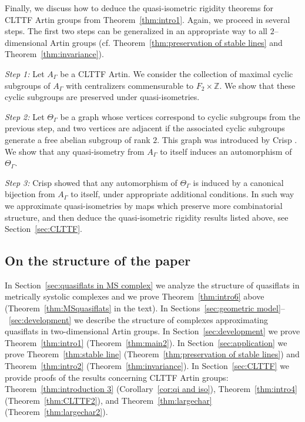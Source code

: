 \documentclass[11pt]{amsart}
\theoremstyle{definition}
\begin{document}
Finally, we discuss how to deduce the quasi-isometric rigidity theorems for CLTTF Artin groups from Theorem~\ref{thm:intro1}. Again, we proceed in several steps. The first two steps can be generalized in an appropriate way to all $2$--dimensional Artin groups (cf. Theorem~\ref{thm:preservation of stable lines} and Theorem~\ref{thm:invariance}).
\medskip

\noindent
\emph{Step 1:} Let $A_\Gamma$ be a CLTTF Artin. We consider the collection of maximal cyclic subgroups of $A_\Gamma$ with centralizers commensurable to $F_2\times\mathbb Z$. We show that these cyclic subgroups are preserved under quasi-isometries. 
\medskip

\noindent
\emph{Step 2:} Let $\Theta_\Gamma$ be a graph whose vertices correspond to cyclic subgroups from the previous step, and two vertices are adjacent if the associated cyclic subgroups generate a free abelian subgroup of rank $2$. This graph was introduced by Crisp \cite{MR2174269}. We show that any quasi-isometry from $A_\Gamma$ to itself induces an automorphism of $\Theta_\Gamma$.
\medskip

\noindent
\emph{Step 3:} Crisp \cite{MR2174269} showed that any automorphism of $\Theta_\Gamma$ is induced by a canonical bijection from $A_\Gamma$ to itself, under appropriate additional conditions. In such way we approximate quasi-isometries by maps which preserve more combinatorial structure, and then deduce the quasi-isometric rigidity results listed above, see Section~\ref{sec:CLTTF}.

\subsection*{On the structure of the paper}
In Section~\ref{sec:quasiflats in MS complex} we analyze the structure of quasiflats in metrically systolic complexes and we prove Theorem~\ref{thm:intro6} above (Theorem~\ref{thm:MSquasiflats} in the text). 
In Sections~\ref{sec:geometric model}--~\ref{sec:development} we describe the structure of complexes
approximating quasiflats in two-dimensional Artin groups. 
In Section~\ref{sec:development} we prove Theorem~\ref{thm:intro1} (Theorem~\ref{thm:main2}).
In Section~\ref{sec:application} we prove Theorem~\ref{thm:stable line} (Theorem~\ref{thm:preservation of stable lines}) and Theorem~\ref{thm:intro2} (Theorem~\ref{thm:invariance}).
In Section~\ref{sec:CLTTF} we provide proofs of the results concerning CLTTF Artin groups: Theorem~\ref{thm:introduction 3} (Corollary~\ref{cor:qi and iso}), Theorem~\ref{thm:intro4} (Theorem~\ref{thm:CLTTF2}), and Theorem~\ref{thm:largechar} (Theorem~\ref{thm:largechar2}).
\end{document}
